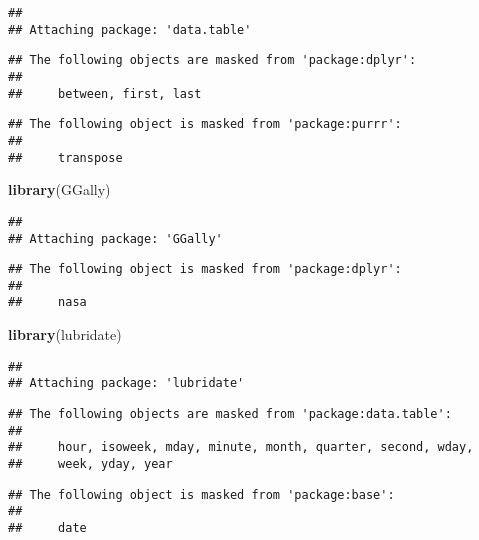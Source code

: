 \documentclass[]{article}
\newenvironment{Shaded}{\begin{snugshade}}{\end{snugshade}}
\newcommand{\KeywordTok}[1]{\textcolor[rgb]{0.13,0.29,0.53}{\textbf{#1}}}
\newcommand{\NormalTok}[1]{#1}
\begin{document}
\begin{verbatim}
## 
## Attaching package: 'data.table'
\end{verbatim}

\begin{verbatim}
## The following objects are masked from 'package:dplyr':
## 
##     between, first, last
\end{verbatim}

\begin{verbatim}
## The following object is masked from 'package:purrr':
## 
##     transpose
\end{verbatim}

\begin{Shaded}
\begin{Highlighting}[]
\KeywordTok{library}\NormalTok{(GGally)}
\end{Highlighting}
\end{Shaded}

\begin{verbatim}
## 
## Attaching package: 'GGally'
\end{verbatim}

\begin{verbatim}
## The following object is masked from 'package:dplyr':
## 
##     nasa
\end{verbatim}

\begin{Shaded}
\begin{Highlighting}[]
\KeywordTok{library}\NormalTok{(lubridate)}
\end{Highlighting}
\end{Shaded}

\begin{verbatim}
## 
## Attaching package: 'lubridate'
\end{verbatim}

\begin{verbatim}
## The following objects are masked from 'package:data.table':
## 
##     hour, isoweek, mday, minute, month, quarter, second, wday,
##     week, yday, year
\end{verbatim}

\begin{verbatim}
## The following object is masked from 'package:base':
## 
##     date
\end{verbatim}
\end{document}
